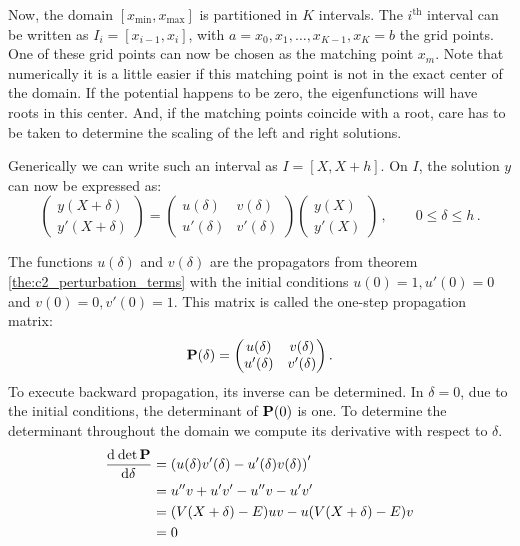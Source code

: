 Now, the domain $[x_\text{min}, x_\text{max}]$ is partitioned in $K$ intervals. The $i^\text{th}$ interval can be written as $I_i = [x_{i-1}, x_{i}]$, with $a = x_0, x_1, \dots, x_{K-1}, x_{K} = b$ the grid points. One of these grid points can now be chosen as the matching point $x_m$. Note that numerically it is a little easier if this matching point is not in the exact center of the domain. If the potential happens to be zero, the eigenfunctions will have roots in this center. And, if the matching points coincide with a root, care has to be taken to determine the scaling of the left and right solutions.

Generically we can write such an interval as $I = [X, X+h]$. On $I$, the solution $y$ can now be expressed as:
\begin{equation}
    \begin{pmatrix}y(X+\delta) \\ y'(X+\delta)\end{pmatrix}
    = \begin{pmatrix} u(\delta) & v(\delta) \\ u'(\delta) & v'(\delta) \end{pmatrix} \begin{pmatrix} y(X) \\ y'(X) \end{pmatrix} \,, \qquad %
    0 \leq \delta \leq h \,. \label{equ:c2_cpm_propmatrix}
\end{equation}

The functions $u(\delta)$ and $v(\delta)$ are the propagators from theorem \ref{the:c2_perturbation_terms} with the initial conditions $u(0) = 1, u'(0)=0$ and
$v(0) = 0, v'(0)=1$. This matrix is called the one-step propagation matrix:
\begin{equation}\label{equ:c2_propagation_matrix}
    \vb{P}(\delta) = \begin{pmatrix} u(\delta) & v(\delta) \\ u'(\delta) & v'(\delta) \end{pmatrix}\text{.}
\end{equation}
To execute backward propagation, its inverse can be determined. In $\delta = 0$, due to the initial conditions, the determinant of $\vb{P}(0)$ is one. To determine the determinant throughout the domain we compute its derivative with respect to $\delta$.
\begin{align*}
    \dv[]{\det\vb{P}}{\delta} & = \left(u(\delta) v'(\delta) - u'(\delta) v(\delta)\right)' \\
                              & = u'' v + u'v' - u''v - u'v'                                \\
                              & =(V(X+\delta) - E) u v - u (V(X+\delta) - E) v              \\
                              & =0
\end{align*}

